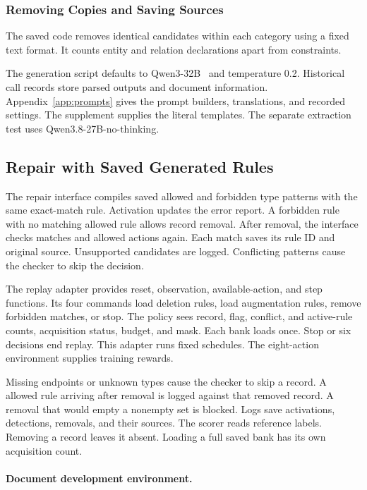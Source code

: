 \subsubsection{Removing Copies and Saving Sources}

The saved code removes identical candidates within each category using
a fixed text format. It counts entity and relation declarations apart
from constraints.

The generation script defaults to Qwen3-32B~\cite{ref_qwen3} and temperature 0.2.
Historical call records store parsed outputs and document information.
Appendix~\ref{app:prompts} gives the prompt builders, translations,
and recorded settings. The supplement supplies the literal templates.
The separate extraction test uses Qwen3.8-27B-no-thinking.

\subsection{Repair with Saved Generated Rules}

\label{sec:rule_bridge_method}

The repair interface compiles saved allowed and forbidden type patterns
with the same exact-match rule. Activation updates the error report.
A forbidden rule with no matching allowed rule allows record removal.
After removal, the interface checks matches and allowed actions again.
Each match saves its rule ID and original source. Unsupported candidates
are logged. Conflicting patterns cause the checker to skip the decision.

The replay adapter provides reset, observation, available-action, and step
functions. Its four commands load deletion rules, load augmentation rules,
remove forbidden matches, or stop. The policy sees record, flag, conflict,
and active-rule counts, acquisition status, budget, and mask.
Each bank loads once. Stop or six decisions end replay. This adapter
runs fixed schedules. The eight-action environment supplies training rewards.

Missing endpoints or unknown types cause the checker to skip a record.
A allowed rule arriving after removal is logged against that removed record.
A removal that would empty a nonempty set is blocked. Logs save activations,
detections, removals, and their sources. The scorer reads reference labels.
Removing a record leaves it absent. Loading a full saved bank has its own
acquisition count.

\paragraph{Document development environment.}

